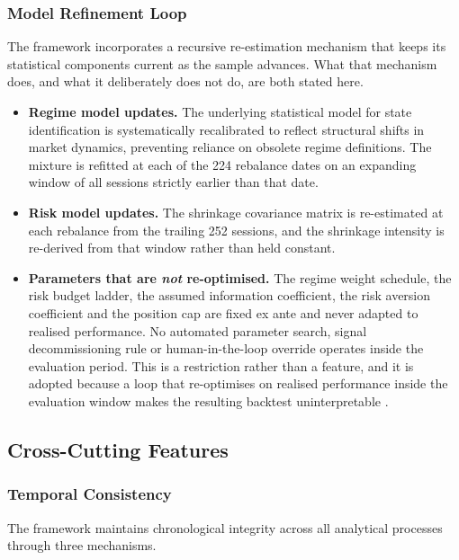 \subsubsection{Model Refinement Loop}

The framework incorporates a recursive re-estimation mechanism that keeps its statistical
components current as the sample advances. What that mechanism does, and what it
deliberately does not do, are both stated here.

\begin{itemize}
\item \textbf{Regime model updates.} The underlying statistical model for state
identification is systematically recalibrated to reflect structural shifts in market
dynamics, preventing reliance on obsolete regime definitions. The mixture is refitted at
each of the 224 rebalance dates on an expanding window of all sessions strictly earlier
than that date.
\item \textbf{Risk model updates.} The shrinkage covariance matrix is re-estimated at
each rebalance from the trailing 252 sessions, and the shrinkage intensity is re-derived
from that window rather than held constant.
\item \textbf{Parameters that are \emph{not} re-optimised.} The regime weight schedule,
the risk budget ladder, the assumed information coefficient, the risk aversion
coefficient and the position cap are fixed ex ante and never adapted to realised
performance. No automated parameter search, signal decommissioning rule or
human-in-the-loop override operates inside the evaluation period. This is a restriction
rather than a feature, and it is adopted because a loop that re-optimises on realised
performance inside the evaluation window makes the resulting backtest uninterpretable
\citep{harvey15}.
\end{itemize}

\subsection{Cross-Cutting Features}

\subsubsection{Temporal Consistency}

The framework maintains chronological integrity across all analytical processes through
three mechanisms.

